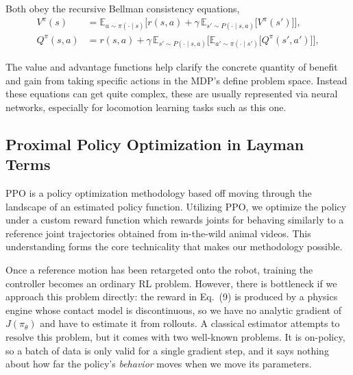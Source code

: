\documentclass{article}
\theoremstyle{plain}
\theoremstyle{definition}
\theoremstyle{remark}
\begin{document}
Both obey the recursive Bellman consistency equations,
\begin{align}
    V^{\pi}(s)    &= \mathbb{E}_{a \sim \pi(\cdot \mid s)}
        \Big[ r(s,a) + \gamma\, \mathbb{E}_{s' \sim P(\cdot \mid s,a)}
        \big[ V^{\pi}(s') \big] \Big], \\[2pt]
    Q^{\pi}(s, a) &= r(s,a) + \gamma\, \mathbb{E}_{s' \sim P(\cdot \mid s,a)}
        \Big[ \mathbb{E}_{a' \sim \pi(\cdot \mid s')}
        \big[ Q^{\pi}(s', a') \big] \Big],
\end{align}

The value and advantage functions help clarify the concrete quantity of benefit and gain from taking specific actions in the MDP's define problem space. Instead these equations can get quite complex, these are usually represented via neural networks, especially for locomotion learning tasks such as this one.

\subsection{Proximal Policy Optimization in Layman Terms}
\label{sec:ppo}

PPO is a policy optimization methodology based off moving through the landscape of an estimated policy function. Utilizing PPO, we optimize the policy under a custom reward function which rewards  joints for behaving similarly to a reference joint trajectories obtained from in-the-wild
animal videos. This understanding forms the core technicality that makes our methodology 
possible.


Once a reference motion has been retargeted onto the robot, training the
controller becomes an ordinary RL problem. However, there is bottleneck if we approach this problem directly: the reward in Eq.~(9) is produced by a physics engine
whose contact model is discontinuous, so we have no analytic gradient of
$J(\pi_\theta)$ and have to estimate it from rollouts. A classical estimator attempts to resolve this problem, but it comes with two well-known problems. It is on-policy,
so a batch of data is only valid for a single gradient step, and it says nothing
about how far the policy's \emph{behavior} moves when we move its parameters.
\end{document}
